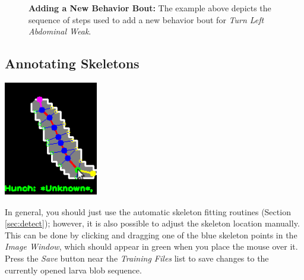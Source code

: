 \documentclass[10pt, onecolumn]{article}
\newcommand{\1}{\textbf{1}}
\begin{document}
\begin{figure}
 \quad {} 
\label{fig:add_behavior}
\caption{\textbf{Adding a New Behavior Bout:} The example above depicts the sequence of steps used to add a new behavior bout for \textit{Turn Left Abdominal Weak}.}  
\end{figure}

\subsection{Annotating Skeletons}

\begin{minipage}[b]{1.0\linewidth}
\centering
\begin{minipage}[b]{0.3\linewidth}
\includegraphics[height=5cm]{EditSkeleton.png}
\end{minipage}
\begin{minipage}[b]{0.5\linewidth}
In general, you should just use the automatic skeleton fitting routines (Section \ref{sec:detect}); however, it is also possible to adjust the skeleton location manually.  This can be done by clicking and dragging one of the blue skeleton points in the \textit{Image Window}, which should appear in green when you place the mouse over it. Press the \textit{Save} button near the \textit{Training Files} list to save changes to the currently opened larva blob sequence.
\end{minipage}
\end{minipage}
\end{document}
